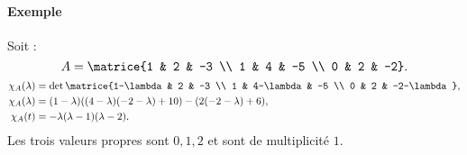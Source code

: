 \documentclass{mybourbaki}
\begin{document}
\paragraph{Exemple}Soit : \[ A = \matrice{1 & 2 & -3 \\ 1 & 4 & -5 \\ 0 & 2 & -2}.\]
\begin{align*}
\chi_A(\lambda) &= \det\matrice{1-\lambda & 2 & -3 \\ 1 & 4-\lambda & -5 \\ 0 & 2 & -2-\lambda},\\
\chi_A(\lambda) &= (1-\lambda)((4-\lambda)(-2-\lambda)+10) - (2(-2-\lambda)+6),\\
\chi_A(t) &= -\lambda(\lambda-1)(\lambda-2).
\end{align*}
Les trois valeurs propres sont $0,1,2$ et sont de multiplicité $1$.
\end{document}
